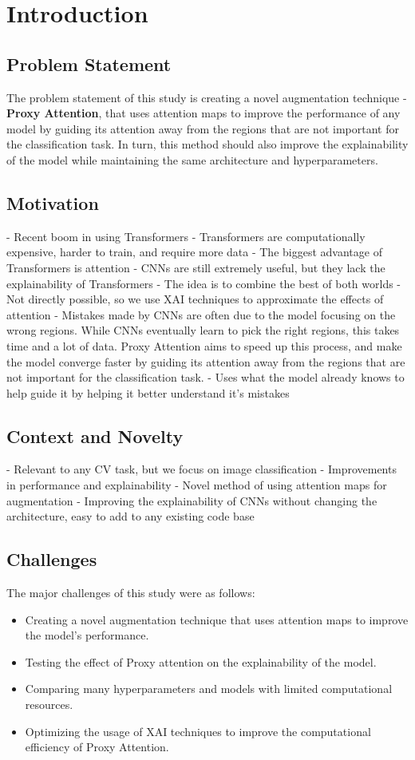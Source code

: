 
\chapter{Introduction}

\section{Problem Statement}
The problem statement of this study is creating a novel augmentation technique - \textbf{Proxy Attention}, that uses attention maps to improve the performance of any model by guiding its attention away from the regions that are not important for the classification task.
In turn, this method should also improve the explainability of the model while maintaining the same architecture and hyperparameters.

\section{Motivation}
- Recent boom in using Transformers
- Transformers are computationally expensive, harder to train, and require more data
- The biggest advantage of Transformers is attention
- CNNs are still extremely useful, but they lack the explainability of Transformers
- The idea is to combine the best of both worlds
- Not directly possible, so we use XAI techniques to approximate the effects of attention
- Mistakes made by CNNs are often due to the model focusing on the wrong regions. While CNNs eventually learn to pick the right regions, this takes time and a lot of data. Proxy Attention aims to speed up this process, and make the model converge faster by guiding its attention away from the regions that are not important for the classification task.
- Uses what the model already knows to help guide it by helping it better understand it's mistakes

\section{Context and Novelty}
- Relevant to any CV task, but we focus on image classification
- Improvements in performance and explainability
- Novel method of using attention maps for augmentation
- Improving the explainability of CNNs without changing the architecture, easy to add to any existing code base

\section{Challenges}
The major challenges of this study were as follows:
\begin{itemize}
    \item Creating a novel augmentation technique that uses attention maps to improve the model's performance.
    \item Testing the effect of Proxy attention on the explainability of the model.
    \item Comparing many hyperparameters and models with limited computational resources.
    \item Optimizing the usage of XAI techniques to improve the computational efficiency of Proxy Attention.
\end{itemize}

